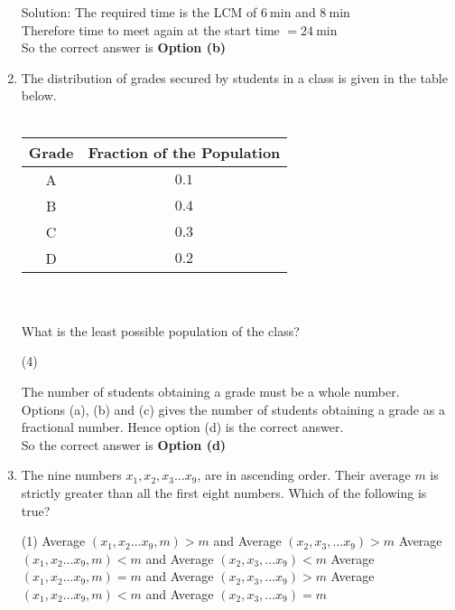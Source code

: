 \begin{enumerate}
\begin{answer}
	Solution: The required time is the LCM of $6 \mathrm{~min}$ and $8 \mathrm{~min}$\\
	Therefore time to meet again at the start time $=24 \mathrm{~min}$\\
		So the correct answer is \textbf{Option (b)}
\end{answer}
	\item 	 The distribution of grades secured by students in a class is given in the table below.\\\\
	\renewcommand*{\arraystretch}{1.2}
	\begin{tabular}{|c|c|}
		\hline Grade & Fraction of the Population \\
		\hline A & $0.1$ \\
		\hline B & $0.4$ \\
		\hline C & $0.3$ \\
		\hline D & $0.2$ \\
		\hline
	\end{tabular}\\\\
	What is the least possible population of the class?
	 \begin{tasks}(4)
	\end{tasks}
\begin{answer}
 The number of students obtaining a grade must be a whole number.\\
	Options (a), (b) and (c) gives the number of students obtaining a grade as a fractional number. Hence option (d) is the correct answer.\\
	So the correct answer is \textbf{Option (d)}
\end{answer}
\item  The nine numbers $x_{1}, x_{2}, x_{3} \ldots x_{9}$, are in ascending order. Their average $m$ is strictly greater than all the first eight numbers. Which of the following is true?
	 \begin{tasks}(1)
		\task[\textbf{a.}]Average $\left(x_{1}, x_{2} \ldots x_{9}, m\right)>m$ and Average $\left(x_{2}, x_{3}, \ldots x_{9}\right)>m$
		\task[\textbf{b.}] Average $\left(x_{1}, x_{2} \ldots x_{9}, m\right)<m$ and Average $\left(x_{2}, x_{3}, \ldots x_{9}\right)<m$
		\task[\textbf{c.}] Average $\left(x_{1}, x_{2} \ldots x_{9}, m\right)=m$ and Average $\left(x_{2}, x_{3}, \ldots x_{9}\right)>m$
		\task[\textbf{d.}] Average $\left(x_{1}, x_{2} \ldots x_{9}, m\right)<m$ and Average $\left(x_{2}, x_{3}, \ldots x_{9}\right)=m$

\end{tasks}
\end{enumerate}
